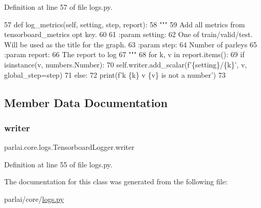 Definition at line 57 of file logs.\+py.


\begin{DoxyCode}
57     \textcolor{keyword}{def }log\_metrics(self, setting, step, report):
58         \textcolor{stringliteral}{"""}
59 \textcolor{stringliteral}{        Add all metrics from tensorboard\_metrics opt key.}
60 \textcolor{stringliteral}{}
61 \textcolor{stringliteral}{        :param setting:}
62 \textcolor{stringliteral}{            One of train/valid/test. Will be used as the title for the graph.}
63 \textcolor{stringliteral}{        :param step:}
64 \textcolor{stringliteral}{            Number of parleys}
65 \textcolor{stringliteral}{        :param report:}
66 \textcolor{stringliteral}{            The report to log}
67 \textcolor{stringliteral}{        """}
68         \textcolor{keywordflow}{for} k, v \textcolor{keywordflow}{in} report.items():
69             \textcolor{keywordflow}{if} isinstance(v, numbers.Number):
70                 self.writer.add\_scalar(f\textcolor{stringliteral}{'\{setting\}/\{k\}'}, v, global\_step=step)
71             \textcolor{keywordflow}{else}:
72                 print(f\textcolor{stringliteral}{'k \{k\} v \{v\} is not a number'})
73 \end{DoxyCode}


\subsection{Member Data Documentation}
\mbox{\label{classparlai_1_1core_1_1logs_1_1TensorboardLogger_afc71d93e950d01b95fc824d347907a58}} 
\subsubsection{\texorpdfstring{writer}{writer}}
{\footnotesize\ttfamily parlai.\+core.\+logs.\+Tensorboard\+Logger.\+writer}



Definition at line 55 of file logs.\+py.



The documentation for this class was generated from the following file\+:\begin{DoxyCompactItemize}
\item 
parlai/core/\hyperlink{logs_8py}{logs.\+py}\end{DoxyCompactItemize}
